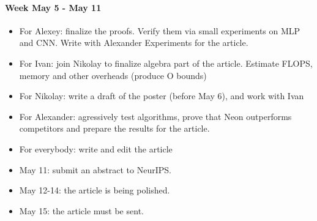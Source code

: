 \documentclass[]{scrartcl}
\begin{document}
\paragraph{Week May 5 - May 11}
\begin{itemize}
    \item For Alexey: finalize the proofs. Verify them via small experiments on MLP and CNN. Write with Alexander Experiments for the article.
    
    \item For Ivan: join Nikolay to finalize algebra part of the article. Estimate FLOPS, memory and other overheads (produce O bounds)
    
    \item For Nikolay: write a draft of the poster (before May 6), and work with Ivan
    
    \item For Alexander: agressively test algorithms, prove that Neon outperforms competitors and prepare the results for the article.
    
    \item For everybody: write and edit the article
    
    \item May 11: submit an abstract to NeurIPS.
    
    \item May 12-14: the article is being polished.
    
    \item May 15: the article must be sent.
\end{itemize}
\end{document}
